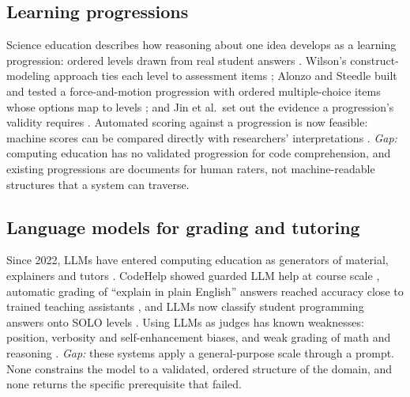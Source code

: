 \documentclass[sigconf,nonacm]{acmart}
\begin{document}
\subsection{Learning progressions}
Science education describes how reasoning about one idea develops as a learning progression: ordered levels
drawn from real student answers \cite{krajcik2023progressions}. Wilson's construct-modeling approach ties each
level to assessment items \cite{wilson2009measuring}; Alonzo and Steedle built and tested a force-and-motion
progression with ordered multiple-choice items whose options map to levels \cite{alonzo2009force}; and Jin
et al.\ set out the evidence a progression's validity requires \cite{jin2019validation}. Automated scoring against
a progression is now feasible: machine scores can be compared directly with researchers' interpretations
\cite{jin2025automated}. \emph{Gap:} computing education has no validated progression for code comprehension,
and existing progressions are documents for human raters, not machine-readable structures that a system can
traverse.

\subsection{Language models for grading and tutoring}
Since 2022, LLMs have entered computing education as generators of material, explainers and tutors
\cite{prather2023robots}. CodeHelp showed guarded LLM help at course scale \cite{liffiton2023codehelp}, automatic
grading of ``explain in plain English'' answers reached accuracy close to trained teaching assistants
\cite{fowler2021autograding}, and LLMs now classify student programming answers onto SOLO levels
\cite{zhang2025solo}. Using LLMs as judges has known weaknesses: position, verbosity and self-enhancement biases, and weak grading of math and reasoning \cite{zheng2023judging}. \emph{Gap:} these systems apply a
general-purpose scale through a prompt. None constrains the model to a validated, ordered structure of the
domain, and none returns the specific prerequisite that failed.
\end{document}
